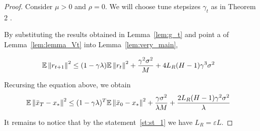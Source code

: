 \begin{proof}
    Consider $\mu > 0$ and $\rho = 0$. We will choose tune stepsizes $\gamma_t$ as in Theorem 2 \citep{Woodworth}.

    By substituting the results obtained in Lemma~\ref{lem:g_t} and point a of Lemma~\ref{lem:lemma_Vt} into Lemma~\ref{lem:very_main},

    
    \begin{align}
        \mathbb{E} \left\|r_{t+1}\right\|^2
        &\leq
        (1 - \gamma \lambda)\mathbb{E} \left\|r_t\right\|^2 
        + \frac{\gamma^2 \sigma^2}{M} + 4 L_R (H-1) \gamma^3 \sigma^2 \label{eq:interesting}
    \end{align}
    
    Recursing the equation above, we obtain
    \begin{align}
        \mathbb{E} \left\|\bar{x}_{T}-x_*\right\|^2 
        & \leq (1 - \gamma \lambda)^T \mathbb{E} \left\|\bar{x}_0 - x_*\right\|^2 
        + \frac{\gamma \sigma^2} {\lambda M} 
        + \frac{2 L_R (H-1) \gamma^2 \sigma^2}{\lambda}
    \end{align}

    It remains to notice that by the statement~\ref{st:st_1} we have $L_R = \varepsilon L$.
\end{proof}